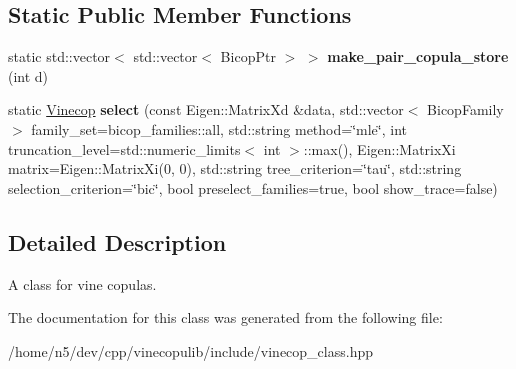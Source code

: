 \subsection*{Static Public Member Functions}
\begin{DoxyCompactItemize}
\item 
static std\+::vector$<$ std\+::vector$<$ Bicop\+Ptr $>$ $>$ {\bfseries make\+\_\+pair\+\_\+copula\+\_\+store} (int d)\hypertarget{classvinecopulib_1_1_vinecop_af0f675bde31f0711e642dd7b65161ef4}{}\label{classvinecopulib_1_1_vinecop_af0f675bde31f0711e642dd7b65161ef4}

\item 
static \hyperlink{classvinecopulib_1_1_vinecop}{Vinecop} {\bfseries select} (const Eigen\+::\+Matrix\+Xd \&data, std\+::vector$<$ Bicop\+Family $>$ family\+\_\+set=bicop\+\_\+families\+::all, std\+::string method=\char`\"{}mle\char`\"{}, int truncation\+\_\+level=std\+::numeric\+\_\+limits$<$ int $>$\+::max(), Eigen\+::\+Matrix\+Xi matrix=Eigen\+::\+Matrix\+Xi(0, 0), std\+::string tree\+\_\+criterion=\char`\"{}tau\char`\"{}, std\+::string selection\+\_\+criterion=\char`\"{}bic\char`\"{}, bool preselect\+\_\+families=true, bool show\+\_\+trace=false)\hypertarget{classvinecopulib_1_1_vinecop_a6a2806138d4ec5aca9db47813968fe11}{}\label{classvinecopulib_1_1_vinecop_a6a2806138d4ec5aca9db47813968fe11}

\end{DoxyCompactItemize}


\subsection{Detailed Description}
A class for vine copulas. 

The documentation for this class was generated from the following file\+:\begin{DoxyCompactItemize}
\item 
/home/n5/dev/cpp/vinecopulib/include/vinecop\+\_\+class.\+hpp\end{DoxyCompactItemize}

